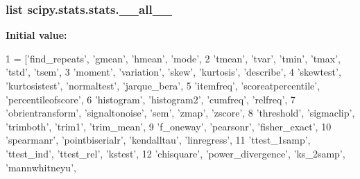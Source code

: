 \begin{DoxyVerb}
\subsubsection[{\+\_\+\+\_\+all\+\_\+\+\_\+}]{\setlength{\rightskip}{0pt plus 5cm}list scipy.\+stats.\+stats.\+\_\+\+\_\+all\+\_\+\+\_\+}\label{namespacescipy_1_1stats_1_1stats_af64e57aacdbdd2800961c4f1ab76adb7}
{\bfseries Initial value\+:}
\begin{DoxyCode}
1 = [\textcolor{stringliteral}{'find\_repeats'}, \textcolor{stringliteral}{'gmean'}, \textcolor{stringliteral}{'hmean'}, \textcolor{stringliteral}{'mode'},
2            \textcolor{stringliteral}{'tmean'}, \textcolor{stringliteral}{'tvar'}, \textcolor{stringliteral}{'tmin'}, \textcolor{stringliteral}{'tmax'}, \textcolor{stringliteral}{'tstd'}, \textcolor{stringliteral}{'tsem'},
3            \textcolor{stringliteral}{'moment'}, \textcolor{stringliteral}{'variation'}, \textcolor{stringliteral}{'skew'}, \textcolor{stringliteral}{'kurtosis'}, \textcolor{stringliteral}{'describe'},
4            \textcolor{stringliteral}{'skewtest'}, \textcolor{stringliteral}{'kurtosistest'}, \textcolor{stringliteral}{'normaltest'}, \textcolor{stringliteral}{'jarque\_bera'},
5            \textcolor{stringliteral}{'itemfreq'}, \textcolor{stringliteral}{'scoreatpercentile'}, \textcolor{stringliteral}{'percentileofscore'},
6            \textcolor{stringliteral}{'histogram'}, \textcolor{stringliteral}{'histogram2'}, \textcolor{stringliteral}{'cumfreq'}, \textcolor{stringliteral}{'relfreq'},
7            \textcolor{stringliteral}{'obrientransform'}, \textcolor{stringliteral}{'signaltonoise'}, \textcolor{stringliteral}{'sem'}, \textcolor{stringliteral}{'zmap'}, \textcolor{stringliteral}{'zscore'},
8            \textcolor{stringliteral}{'threshold'}, \textcolor{stringliteral}{'sigmaclip'}, \textcolor{stringliteral}{'trimboth'}, \textcolor{stringliteral}{'trim1'}, \textcolor{stringliteral}{'trim\_mean'},
9            \textcolor{stringliteral}{'f\_oneway'}, \textcolor{stringliteral}{'pearsonr'}, \textcolor{stringliteral}{'fisher\_exact'},
10            \textcolor{stringliteral}{'spearmanr'}, \textcolor{stringliteral}{'pointbiserialr'}, \textcolor{stringliteral}{'kendalltau'}, \textcolor{stringliteral}{'linregress'},
11            \textcolor{stringliteral}{'ttest\_1samp'}, \textcolor{stringliteral}{'ttest\_ind'}, \textcolor{stringliteral}{'ttest\_rel'}, \textcolor{stringliteral}{'kstest'},
12            \textcolor{stringliteral}{'chisquare'}, \textcolor{stringliteral}{'power\_divergence'}, \textcolor{stringliteral}{'ks\_2samp'}, \textcolor{stringliteral}{'mannwhitneyu'},

\end{DoxyCode}
\end{DoxyVerb}
